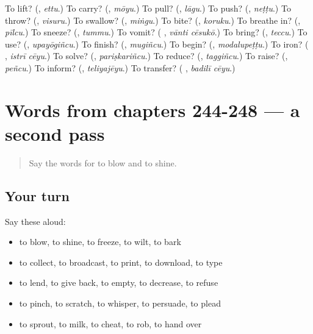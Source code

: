 \begin{tcolorbox}[breakable,colback=teal!4,colframe=teal!35!black,title={Before you move on}]
To lift? (\textbf{}, \emph{ettu}.) To carry? (\textbf{}, \emph{mōyu}.) To pull? (\textbf{}, \emph{lāgu}.) To push? (\textbf{}, \emph{neṭṭu}.) To throw? (\textbf{}, \emph{visuru}.) To swallow? (\textbf{}, \emph{miṅgu}.) To bite? (\textbf{}, \emph{koruku}.) To breathe in? (\textbf{}, \emph{pīlcu}.) To sneeze? (\textbf{}, \emph{tummu}.) To vomit? (\textbf{ }, \emph{vānti cēsukō}.) To bring? (\textbf{}, \emph{teccu}.) To use? (\textbf{}, \emph{upayōgiñcu}.) To finish? (\textbf{}, \emph{mugiñcu}.) To begin? (\textbf{}, \emph{modalupeṭṭu}.) To iron? (\textbf{ }, \emph{istrī cēyu}.) To solve? (\textbf{}, \emph{pariṣkariñcu}.) To reduce? (\textbf{}, \emph{taggiñcu}.) To raise? (\textbf{}, \emph{peñcu}.) To inform? (\textbf{}, \emph{teliyajēyu}.) To transfer? (\textbf{ }, \emph{badilī cēyu}.)
\end{tcolorbox}
\section[(dialogue)]{Words from chapters 244-248 — a second pass}

\label{lesson:TE-R248-second-pass-words-from-chapters-244-248}



\begin{quote}
Say the words for to blow and to shine.
\end{quote}

\subsection*{Your turn}
Say these aloud:

\begin{itemize}
\raggedright
  \item to blow, to shine, to freeze, to wilt, to bark
  \item to collect, to broadcast, to print, to download, to type
  \item to lend, to give back, to empty, to decrease, to refuse
  \item to pinch, to scratch, to whisper, to persuade, to plead
  \item to sprout, to milk, to cheat, to rob, to hand over
\end{itemize}

